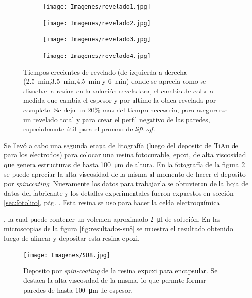 { 				%
 				\begin{figure}[th]
			 	   	    \centering
			 	   	    \begin{subfigure}[t]{0.235\textwidth}
			        	\texttt{[image: Imagenes/revelado1.jpg]}
			       		\end{subfigure}
			     		\begin{subfigure}[t]{0.235\textwidth}
			     		\texttt{[image: Imagenes/revelado2.jpg]}
			    		\end{subfigure}
			     		\begin{subfigure}[t]{0.235\textwidth}
			         	\texttt{[image: Imagenes/revelado3.jpg]}
			        	\end{subfigure}
						\begin{subfigure}[t]{0.235\textwidth}
			     		\texttt{[image: Imagenes/revelado4.jpg]}
			        	\end{subfigure}
			     		\caption[Revelado en función del tiempo]{Tiempos crecientes de revelado (de izquierda  a derecha (\SI{2.5}{min},\SI{3.5}{min},\SI{4.5}{min} y \SI{6}{min}) donde se aprecia como se disuelve la resina en la solución reveladora, el cambio de color a medida que cambia el espesor y por último la oblea revelada por completo. Se deja un 20\% mas del tiempo necesario, para asegurarse un revelado total y para crear el perfil negativo de las paredes, especialmente útil para el proceso de\textit{ lift-off}.}
			     		\label{fig:revelado}
			     	   	\end{figure}

 		 Se llevó a cabo una segunda etapa de litografía (luego del deposito de Ti\textbar Au de para los electrodos) para colocar una resina fotocurable, epoxi, de alta viscosidad que genera estructuras de hasta \SI{100}{\um} de altura. En la fotografía de la figura \ref{fig:su8} se puede apreciar la alta viscosidad de la misma al momento de hacer el deposito por \textit{spincoating}. Nuevamente los datos para trabajarla se obtuvieron de la hoja de datos del fabricante\cite{Su8,Microchemicals2014} y los detalles experimentales fueron expuestos en  sección \ref{sec:fotolito}, pág. \pageref{sec:fotolito}. Esta resina se uso para hacer la celda electroquímica}, la cual puede contener un volemen aproximado \SI{2}{\ul} de solución. En las microscopias de la figura \ref{fig:resultados-su8} se muestra el resultado obtenido luego de alinear y depositar esta resina epoxi.

 				\begin{figure}[ht!]
 				\centering
 				\texttt{[image: Imagenes/SU8.jpg]}
 				\caption[Deposito de la resina epoxi SU8]{Deposito por \textit{spin-coating }de la resina expoxi para encapsular. Se destaca la alta viscosidad de la misma, lo que permite formar paredes de hasta \SI{100}{\um} de espesor.}
 				\label{fig:su8}
 				\end{figure}

